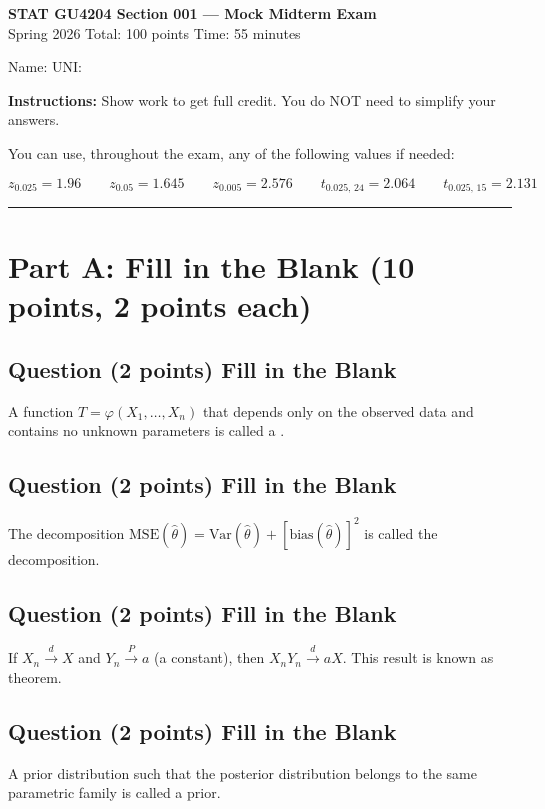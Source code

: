 \documentclass[11pt]{article}
\newcounter{qnum}
\newcommand{\question}[2]{\stepcounter{qnum}\subsection*{Question \theqnum \quad (#1 points) \hfill #2}}
\begin{document}
\begin{center}
{\LARGE\bfseries STAT GU4204 Section 001 --- Mock Midterm Exam}\\[6pt]
{\large Spring 2026 \hspace{2cm} Total: 100 points \hspace{2cm} Time: 55 minutes}\\[4pt]
\end{center}

\medskip

Name: \underline{\hspace{3in}} \hspace{1cm} UNI: \underline{\hspace{1.5in}}

\medskip

\textbf{Instructions:} Show work to get full credit. You do NOT need to simplify your answers.

\medskip

You can use, throughout the exam, any of the following values if needed:

$$z_{0.025} = 1.96 \qquad z_{0.05} = 1.645 \qquad z_{0.005} = 2.576 \qquad t_{0.025,\,24} = 2.064 \qquad t_{0.025,\,15} = 2.131$$

\bigskip
\hrule
\bigskip

\section{Part A: Fill in the Blank \hfill (10 points, 2 points each)}

\question{2}{Fill in the Blank}
A function $T = \varphi(X_1, \ldots, X_n)$ that depends only on the observed data and contains no unknown parameters is called a \underline{\hspace{2.5in}}.

\question{2}{Fill in the Blank}
The decomposition $\text{MSE}(\hat\theta) = \text{Var}(\hat\theta) + [\text{bias}(\hat\theta)]^2$ is called the \underline{\hspace{2.5in}} decomposition.

\question{2}{Fill in the Blank}
If $X_n \xrightarrow{d} X$ and $Y_n \xrightarrow{P} a$ (a constant), then $X_n Y_n \xrightarrow{d} aX$. This result is known as \underline{\hspace{2.5in}} theorem.

\question{2}{Fill in the Blank}
A prior distribution such that the posterior distribution belongs to the same parametric family is called a \underline{\hspace{2.5in}} prior.
\end{document}
